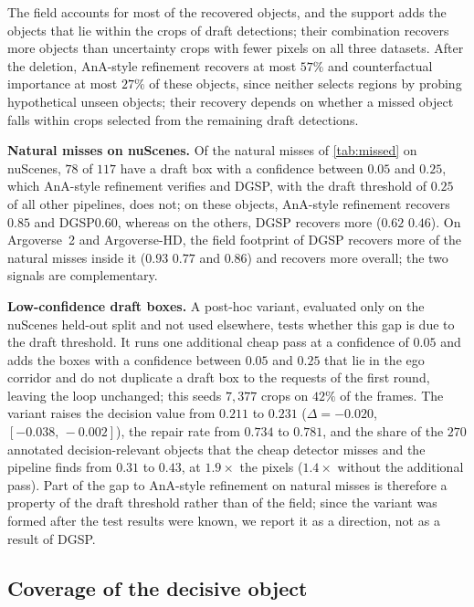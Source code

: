 \documentclass[10pt,letterpaper]{article}
\newcommand{\method}{DGSP\xspace}
\newcommand{\ci}[2]{[#1,\allowbreak\,#2]}
\theoremstyle{remark}
\theoremstyle{plain}
\theoremstyle{definition}
\begin{document}
The field accounts for most of the recovered objects, and the support adds the objects that lie within the crops of draft detections; their combination recovers more objects than uncertainty crops with fewer pixels on all three datasets.
After the deletion, AnA-style refinement recovers at most $57\%$ and counterfactual importance at most $27\%$ of these objects, since neither selects regions by probing hypothetical unseen objects; their recovery depends on whether a missed object falls within crops selected from the remaining draft detections.

\noindent\textbf{Natural misses on nuScenes.}
Of the natural misses of \cref{tab:missed} on nuScenes, $78$ of $117$ have a draft box with a confidence between $0.05$ and $0.25$, which AnA-style refinement verifies and \method, with the draft threshold of $0.25$ of all other pipelines, does not; on these objects, AnA-style refinement recovers $0.85$ and \method $0.60$, whereas on the others, \method recovers more ($0.62$ \vs $0.46$).
On Argoverse~2 and Argoverse-HD, the field footprint of \method recovers more of the natural misses inside it ($0.93$ \vs $0.77$ and $0.86$) and recovers more overall; the two signals are complementary.

\noindent\textbf{Low-confidence draft boxes.}
A post-hoc variant, evaluated only on the nuScenes held-out split and not used elsewhere, tests whether this gap is due to the draft threshold.
It runs one additional cheap pass at a confidence of $0.05$ and adds the boxes with a confidence between $0.05$ and $0.25$ that lie in the ego corridor and do not duplicate a draft box to the requests of the first round, leaving the loop unchanged; this seeds $7{,}377$ crops on $42\%$ of the frames.
The variant raises the decision value from $0.211$ to $0.231$ ($\Delta=-0.020$, $\ci{-0.038}{-0.002}$), the repair rate from $0.734$ to $0.781$, and the share of the $270$ annotated decision-relevant objects that the cheap detector misses and the pipeline finds from $0.31$ to $0.43$, at $1.9\times$ the pixels ($1.4\times$ without the additional pass).
Part of the gap to AnA-style refinement on natural misses is therefore a property of the draft threshold rather than of the field; since the variant was formed after the test results were known, we report it as a direction, not as a result of \method.

\subsection{Coverage of the decisive object}
\label{sec:supp_coverage}
\end{document}
